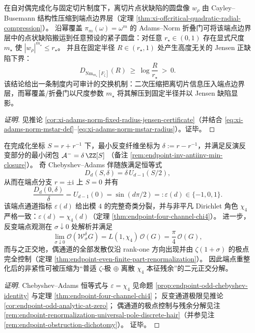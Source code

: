\begin{conclusion}\label{con:xi-terminal-scale-exchange-power-covering-jensen}
在自对偶完成化与固定切片制度下，离切片点状缺陷的圆盘像 \(w_\rho\) 由 Cayley--Busemann 结构性压缩到端点边界层（定理 \ref{thm:xi-offcritical-quadratic-radial-compression}）。
沿幂覆盖 \(\pi_m(\omega)=\omega^m\) 的 Adams--Norm 折叠门可将该端点边界层中的点状缺陷搬运到任意预设的紧子圆盘：对任意 \(r_\star\in(0,1)\) 存在显式尺度 \(m_\star\) 使 \(|w_\rho|^{m_\star}\le r_\star\)。
并且在固定半径 \(R\in(r_\star,1)\) 处产生高度无关的 Jensen 正缺陷下界：
\[
D_{\mathrm{Nm}_{m_\star}[F_\zeta]}(R)\ \ge\ \log\!\frac{R}{r_\star}\ >\ 0.
\]
该结论给出一条制度内可审计的交换机制：二次压缩把离切片信息压入端点边界层，而幂覆盖/折叠门以尺度参数 \(m_\star\) 将其解压到固定半径并以 Jensen 缺陷显影。
\end{conclusion}
\begin{proof}[证明]
见推论 \ref{cor:xi-adams-norm-fixed-radius-jensen-certificate}（并结合 \eqref{eq:xi-adams-norm-mstar-def}--\eqref{eq:xi-adams-norm-mstar-radius}）。证毕。
\end{proof}

\begin{conclusion}\label{con:xi-terminal-endpoint-renormalization-zeta-chi4-orthogonal}
在完成化坐标 \(S=r+r^{-1}\) 下，最小反变纤维坐标为 \(\delta:=r-r^{-1}\)，并满足反演反变部分的最小闭包
\(
\mathcal{A}^{-}=\delta\,\ZZ[S]
\)
（备注 \ref{rem:endpoint-inv-antiinv-min-closure}）。
奇 Chebyshev--Adams 伴随族满足恒等式
\[
D_d(S,\delta)=\delta\,U_{d-1}(S/2),
\]
从而在端点分支 \(r=\pm\mathrm{i}\) 上 \(S=0\) 并有
\[
\frac{D_d(0,\delta)}{\delta}=U_{d-1}(0)=\sin(d\pi/2)=:\varepsilon(d)\in\{-1,0,1\}.
\]
该端点通道指标 \(\varepsilon(d)\) 给出模 \(4\) 的完整奇类分裂，并与非平凡 Dirichlet 角色 \(\chi_4\) 严格一致：\(\varepsilon(d)=\chi_4(d)\)（定理 \ref{thm:endpoint-four-channel-chi4}）。
进一步，反变端点观测在 \(\sigma\downarrow 0\) 处解析并满足
\[
\lim_{\sigma\downarrow 0}\mathcal O(\mathcal W_{\sigma}^{\delta}G)
=L(1,\chi_4)\,\mathcal O(G)=\frac{\pi}{4}\,\mathcal O(G),
\]
而与之正交地，偶通道的全部发散仅沿 rank-one 方向出现并由 \(\zeta(1+\sigma)\) 的极点完全控制（定理 \ref{thm:endpoint-even-finite-part-renormalization}）。
因此端点重整化后的非紧性可被压缩为“普适 \(\zeta\)-极 \(\oplus\) 离散 \(\chi_4\) 本征残余”的二元正交分解。
\end{conclusion}
\begin{proof}[证明]
Chebyshev--Adams 恒等式与 \(\varepsilon=\chi_4\) 见命题 \ref{prop:endpoint-odd-chebyshev-identity} 与定理 \ref{thm:endpoint-four-channel-chi4}；
反变通道极限见推论 \ref{cor:endpoint-odd-analytic-at-zero}；
偶通道的极点控制与残余分解见注 \ref{rem:endpoint-renormalization-universal-pole-discrete-hair}（并参见注 \ref{rem:endpoint-obstruction-dichotomy}）。
证毕。
\end{proof}

